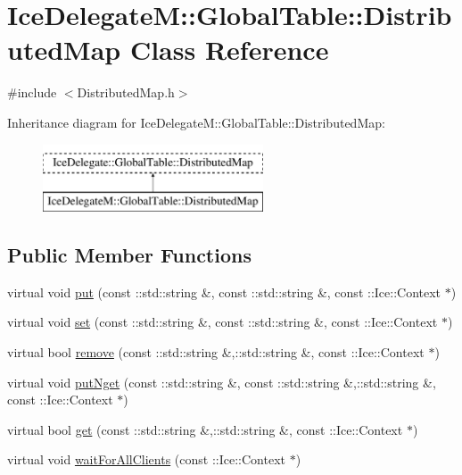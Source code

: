 \hypertarget{class_ice_delegate_m_1_1_global_table_1_1_distributed_map}{
\section{IceDelegateM::GlobalTable::DistributedMap Class Reference}
\label{class_ice_delegate_m_1_1_global_table_1_1_distributed_map}
}


{\ttfamily \#include $<$DistributedMap.h$>$}

Inheritance diagram for IceDelegateM::GlobalTable::DistributedMap:\begin{figure}[H]
\begin{center}
\leavevmode
\includegraphics[height=2cm]{class_ice_delegate_m_1_1_global_table_1_1_distributed_map}
\end{center}
\end{figure}
\subsection*{Public Member Functions}
\begin{DoxyCompactItemize}
\item 
virtual void \hyperlink{class_ice_delegate_m_1_1_global_table_1_1_distributed_map_ab20480bb054ed00e52cbfd2e7d0d5439}{put} (const ::std::string \&, const ::std::string \&, const ::Ice::Context $\ast$)
\item 
virtual void \hyperlink{class_ice_delegate_m_1_1_global_table_1_1_distributed_map_a0b04a83967513107ea86902bd22d57e1}{set} (const ::std::string \&, const ::std::string \&, const ::Ice::Context $\ast$)
\item 
virtual bool \hyperlink{class_ice_delegate_m_1_1_global_table_1_1_distributed_map_a12d1244d77d87ecc420b3fb020f22af4}{remove} (const ::std::string \&,::std::string \&, const ::Ice::Context $\ast$)
\item 
virtual void \hyperlink{class_ice_delegate_m_1_1_global_table_1_1_distributed_map_adc403dbc33076ea6b12c26992aba5026}{putNget} (const ::std::string \&, const ::std::string \&,::std::string \&, const ::Ice::Context $\ast$)
\item 
virtual bool \hyperlink{class_ice_delegate_m_1_1_global_table_1_1_distributed_map_a1b87848a88f6d10e865f13398512daf7}{get} (const ::std::string \&,::std::string \&, const ::Ice::Context $\ast$)
\item 
virtual void \hyperlink{class_ice_delegate_m_1_1_global_table_1_1_distributed_map_aca44b83949cf990bca5020ef81041635}{waitForAllClients} (const ::Ice::Context $\ast$)
\end{DoxyCompactItemize}


